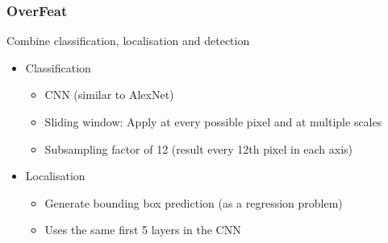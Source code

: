 \subsubsection{OverFeat}
Combine classification, localisation and detection
\begin{itemize}
    \item Classification
          \begin{itemize}
              \item CNN (similar to AlexNet)
              \item Sliding window: Apply at every possible pixel and at multiple scales
              \item Subsampling factor of 12 (result every 12th pixel in each axis)
          \end{itemize}
    \item Localisation
          \begin{itemize}
              \item Generate bounding box prediction (as a regression problem)
              \item Uses the same first 5 layers in the CNN
          \end{itemize}
\end{itemize}
